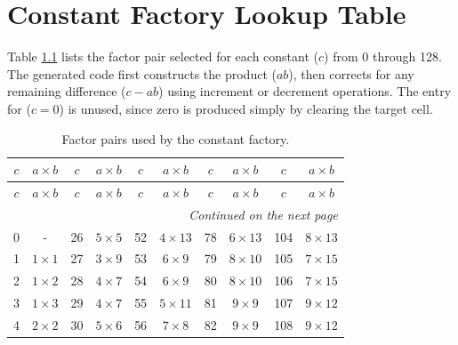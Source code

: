 \chapter{Constant Factory Lookup Table} \label{sec:appendix:factorytable}

Table \ref{tab:constant-factors} lists the factor pair selected for each
constant ($c$) from 0 through 128. The generated code first constructs the
product ($ab$), then corrects for any remaining difference ($c-ab$) using
increment or decrement operations. The entry for ($c=0$) is unused, since
zero is produced simply by clearing the target cell.

\begingroup
\small
\setlength{\tabcolsep}{4.5pt}
\renewcommand{\arraystretch}{1.05}


\begin{longtable}{
r|c @{\qquad}
r|c @{\qquad}
r|c @{\qquad}
r|c @{\qquad}
r|c
}
\caption{Factor pairs used by the constant factory.}
\label{tab:constant-factors} \\
%
\toprule
\multicolumn{1}{c|}{$c$} & $a \times b$ &
\multicolumn{1}{c|}{$c$} & $a \times b$ &
\multicolumn{1}{c|}{$c$} & $a \times b$ &
\multicolumn{1}{c|}{$c$} & $a \times b$ &
\multicolumn{1}{c|}{$c$} & $a \times b$ \\
\midrule
\endfirsthead
%
\toprule
\multicolumn{1}{c|}{$c$} & $a \times b$ &
\multicolumn{1}{c|}{$c$} & $a \times b$ &
\multicolumn{1}{c|}{$c$} & $a \times b$ &
\multicolumn{1}{c|}{$c$} & $a \times b$ &
\multicolumn{1}{c|}{$c$} & $a \times b$ \\
\midrule
\endhead
%
\midrule
\multicolumn{10}{r}{\emph{Continued on the next page}} \\
\endfoot
%
\bottomrule
\endlastfoot

0  & -  &
26 & $5 \times 5$  &
52 & $4 \times 13$ &
78 & $6 \times 13$ &
104 & $8 \times 13$ \\

1  & $1 \times 1$  &
27 & $3 \times 9$  &
53 & $6 \times 9$  &
79 & $8 \times 10$ &
105 & $7 \times 15$ \\

2  & $1 \times 2$  &
28 & $4 \times 7$  &
54 & $6 \times 9$  &
80 & $8 \times 10$ &
106 & $7 \times 15$ \\

3  & $1 \times 3$  &
29 & $4 \times 7$  &
55 & $5 \times 11$ &
81 & $9 \times 9$  &
107 & $9 \times 12$ \\

4  & $2 \times 2$  &
30 & $5 \times 6$  &
56 & $7 \times 8$  &
82 & $9 \times 9$  &
108 & $9 \times 12$ \\


\end{longtable}
